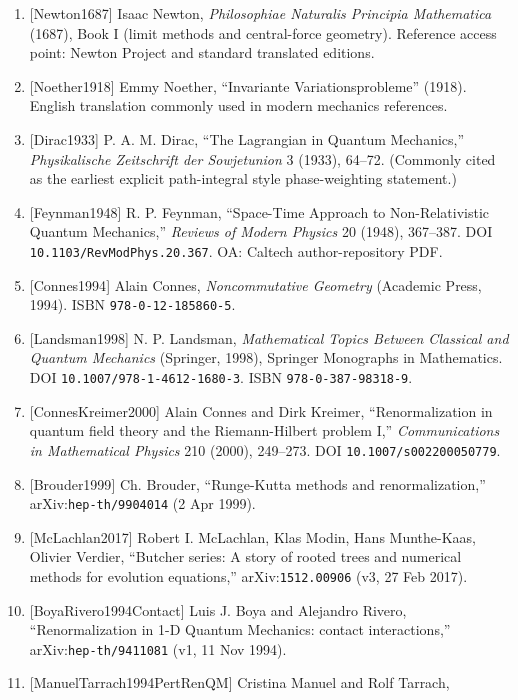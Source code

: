 \documentclass[
]{article}
\providecommand{\tightlist}{%
  \setlength{\itemsep}{0pt}\setlength{\parskip}{0pt}}
\begin{document}
\begin{enumerate}
\def\labelenumi{\arabic{enumi}.}
\tightlist
\item
  {[}Newton1687{]} Isaac Newton, \emph{Philosophiae Naturalis Principia
  Mathematica} (1687), Book I (limit methods and central-force
  geometry). Reference access point: Newton Project and standard
  translated editions.
\item
  {[}Noether1918{]} Emmy Noether, ``Invariante Variationsprobleme''
  (1918). English translation commonly used in modern mechanics
  references.
\item
  {[}Dirac1933{]} P. A. M. Dirac, ``The Lagrangian in Quantum
  Mechanics,'' \emph{Physikalische Zeitschrift der Sowjetunion} 3
  (1933), 64--72. (Commonly cited as the earliest explicit path-integral
  style phase-weighting statement.)
\item
  {[}Feynman1948{]} R. P. Feynman, ``Space-Time Approach to
  Non-Relativistic Quantum Mechanics,'' \emph{Reviews of Modern Physics}
  20 (1948), 367--387. DOI \texttt{10.1103/RevModPhys.20.367}. OA:
  Caltech author-repository PDF.
\item
  {[}Connes1994{]} Alain Connes, \emph{Noncommutative Geometry}
  (Academic Press, 1994). ISBN \texttt{978-0-12-185860-5}.
\item
  {[}Landsman1998{]} N. P. Landsman, \emph{Mathematical Topics Between
  Classical and Quantum Mechanics} (Springer, 1998), Springer Monographs
  in Mathematics. DOI \texttt{10.1007/978-1-4612-1680-3}. ISBN
  \texttt{978-0-387-98318-9}.
\item
  {[}ConnesKreimer2000{]} Alain Connes and Dirk Kreimer,
  ``Renormalization in quantum field theory and the Riemann-Hilbert
  problem I,'' \emph{Communications in Mathematical Physics} 210 (2000),
  249--273. DOI \texttt{10.1007/s002200050779}.
\item
  {[}Brouder1999{]} Ch. Brouder, ``Runge-Kutta methods and
  renormalization,'' arXiv:\texttt{hep-th/9904014} (2 Apr 1999).
\item
  {[}McLachlan2017{]} Robert I. McLachlan, Klas Modin, Hans Munthe-Kaas,
  Olivier Verdier, ``Butcher series: A story of rooted trees and
  numerical methods for evolution equations,'' arXiv:\texttt{1512.00906}
  (v3, 27 Feb 2017).
\item
  {[}BoyaRivero1994Contact{]} Luis J. Boya and Alejandro Rivero,
  ``Renormalization in 1-D Quantum Mechanics: contact interactions,''
  arXiv:\texttt{hep-th/9411081} (v1, 11 Nov 1994).
\item
  {[}ManuelTarrach1994PertRenQM{]} Cristina Manuel and Rolf Tarrach,

\end{enumerate}
\end{document}
